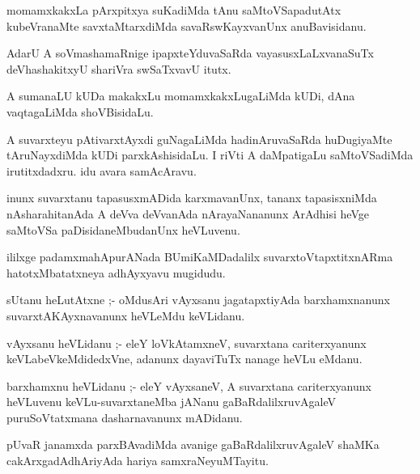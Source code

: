 \documentclass{article}
\begin{document}
\begin{mn}
momamxkakxLa pArxpitxya suKadiMda tAnu saMtoVSapadutAtx kubeVranaMte 
savxtaMtarxdiMda savaRswKayxvanUnx anuBavisidanu.
\end{mn}

\begin{mn}
AdarU A soVmashamaRnige ipapxteYduvaSaRda vayasusxLaLxvanaSuTx deVhashakitxyU 
shariVra swSaTxvavU itutx.
\end{mn}

\begin{mn}
A sumanaLU kUDa makakxLu momamxkakxLugaLiMda kUDi, dAna vaqtagaLiMda shoVBisidaLu.
\end{mn}

\begin{mn}
A suvarxteyu pAtivarxtAyxdi guNagaLiMda hadinAruvaSaRda huDugiyaMte 
tAruNayxdiMda kUDi parxkAshisidaLu. I riVti A daMpatigaLu saMtoVSadiMda 
irutitxdadxru. idu avara samAcAravu.
\end{mn}

\begin{mn}
inunx suvarxtanu tapasusxmADida karxmavanUnx, tananx tapasisxniMda 
nAsharahitanAda  A deVva deVvanAda nArayaNananunx ArAdhisi heVge saMtoVSa 
paDisidaneMbudanUnx heVLuvenu.
\end{mn}

\begin{mn}
ililxge padamxmahApurANada BUmiKaMDadalilx suvarxtoVtapxtitxnARma hatotxMbatatxneya adhAyxyavu mugidudu.
\end{mn}



\begin{mn}
sUtanu heLutAtxne ;- oMdusAri vAyxsanu jagatapxtiyAda barxhamxnanunx suvarxtAKAyxnavanunx heVLeMdu keVLidanu.
\end{mn}

\begin{mn}
vAyxsanu heVLidanu ;- eleY loVkAtamxneV, suvarxtana cariterxyanunx keVLabeVkeMdidedxVne,  
adanunx dayaviTuTx nanage heVLu eMdanu.
\end{mn}

\begin{mn}
barxhamxnu heVLidanu ;- eleY vAyxsaneV, A suvarxtana cariterxyanunx heVLuvenu 
keVLu-suvarxtaneMba jANanu gaBaRdalilxruvAgaleV puruSoVtatxmana dasharnavanunx mADidanu.
\end{mn}

\begin{mn}
pUvaR janamxda parxBAvadiMda avanige gaBaRdalilxruvAgaleV shaMKa cakArxgadAdhAriyAda 
hariya samxraNeyuMTayitu.
\end{mn}
\end{document}
